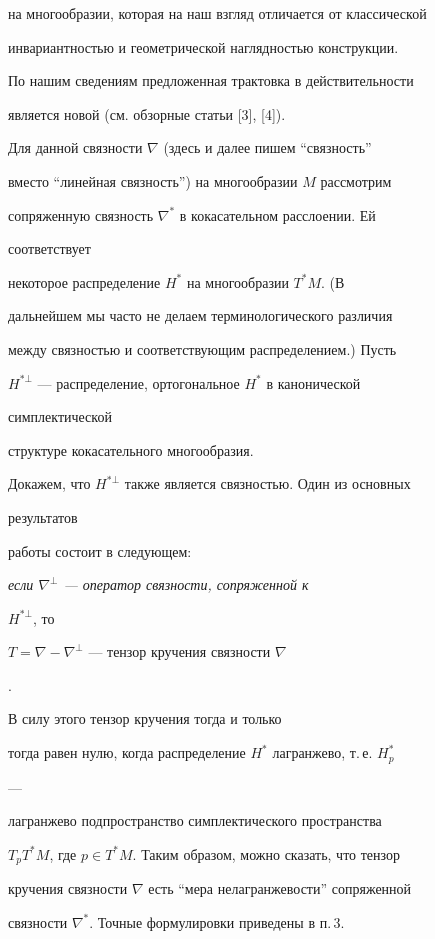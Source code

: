 на многообразии, которая на наш взгляд отличается от классической  


инвариантностью и геометрической наглядностью конструкции.  


По нашим сведениям предложенная трактовка в действительности  


является новой (см. обзорные статьи [3], [4]). 


 


Для данной связности $\nabla$ (здесь и далее пишем ``связность'' 


вместо ``линейная связность'') на многообразии $M$ рассмотрим 


сопряженную связность $\nabla^*$ в кокасательном расслоении. Ей 


соответствует  


некоторое распределение $H^*$ на многообразии $T^*M$. (В 


дальнейшем мы часто не делаем терминологического различия 


между связностью и соответствующим распределением.) Пусть 


$H^{*\bot}$ --- распределение, ортогональное $H^*$ в канонической 


симплектической  


структуре кокасательного многообразия. 


Докажем, что $H^{*\bot}$ также является связностью. Один из основных 


результатов  


работы состоит в следующем: 


{\it если $\nabla^\bot$ --- оператор связности, сопряженной к 


$H^{*\bot}$, то 


$T=\nabla-\nabla^\bot$ --- тензор кручения связности $\nabla$}. 


 


В силу этого тензор кручения тогда и только 


тогда равен нулю, когда распределение $H^*$ лагранжево, т.\,е. $H^*_p$ 


--- 


лагранжево подпространство симплектического пространства 


$T_pT^*M$, где $p\in T^*M$. Таким образом, можно сказать, что тензор 


кручения связности $\nabla$ есть ``мера нелагранжевости'' сопряженной 


связности $\nabla^*$. Точные формулировки приведены в п.\,3. 


